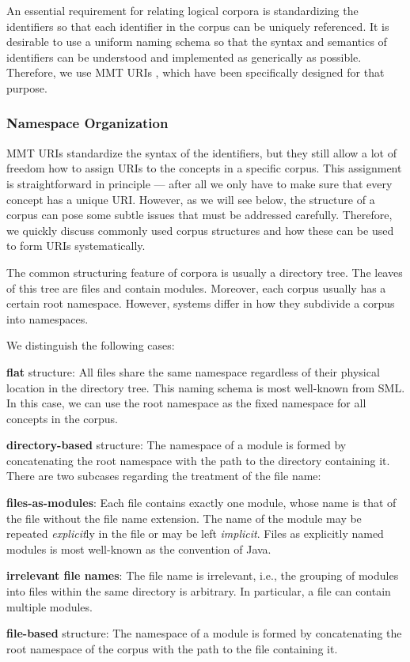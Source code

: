 An essential requirement for relating logical corpora is standardizing the identifiers so that each identifier in the corpus can be uniquely referenced.
It is desirable to use a uniform naming schema so that the syntax and semantics of identifiers can be understood and implemented as generically as possible.
Therefore, we use MMT URIs \cite{RK:mmt:10}, which have been specifically designed for that purpose.

\subsubsection{Namespace Organization}

MMT URIs standardize the syntax of the identifiers, but they still allow a lot of freedom how to assign URIs to the concepts in a specific corpus.
This assignment is straightforward in principle --- after all we only have to make sure that every concept has a unique URI.
However, as we will see below, the structure of a corpus can pose some subtle issues that must be addressed carefully. 
Therefore, we quickly discuss commonly used corpus structures and how these can be used to form URIs systematically.

The common structuring feature of corpora is usually a directory tree.
The leaves of this tree are files and contain modules.
Moreover, each corpus usually has a certain root namespace.
However, systems differ in how they subdivide a corpus into namespaces.

We distinguish the following cases:
\begin{compactitem}
 \item \textbf{flat} structure: All files share the same namespace regardless of their physical location in the directory tree.
 This naming schema is most well-known from SML.
 In this case, we can use the root namespace as the fixed namespace for all concepts in the corpus.
 \item \textbf{directory-based} structure: The namespace of a module is formed by concatenating the root namespace with the path to the directory containing it.
 There are two subcases regarding the treatment of the file name:
  \begin{compactitem}
    \item \textbf{files-as-modules}: Each file contains exactly one module, whose name is that of the file without the file name extension.
    The name of the module may be repeated \emph{explicit}ly in the file or may be left \emph{implicit}.
    Files as explicitly named modules is most well-known as the convention of Java.
    \item \textbf{irrelevant file names}: The file name is irrelevant, i.e., the grouping of modules into files within the same directory is arbitrary.
    In particular, a file can contain multiple modules.
  \end{compactitem}
 \item \textbf{file-based} structure: The namespace of a module is formed by concatenating the root namespace of the corpus with the path to the file containing it.
\end{compactitem}

